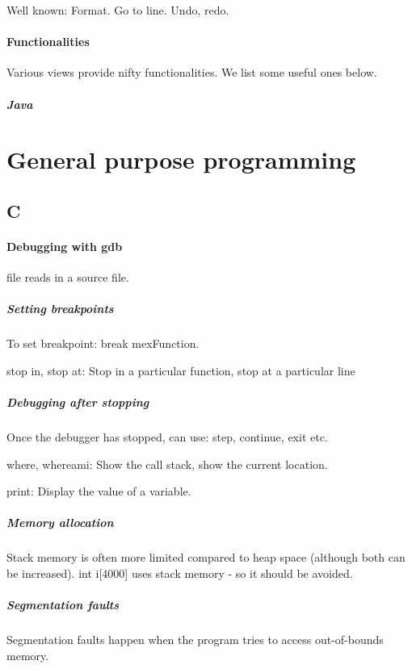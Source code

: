 \documentclass[oneside, article]{memoir}
\begin{document}
Well known: Format. Go to line. Undo, redo.

\subsection{Functionalities}
Various views provide nifty functionalities. We list some useful ones below.

\subsubsection{Java}
\tbc

\part{General purpose programming}
\chapter{C}
\subsection{Debugging with gdb}
file reads in a source file.

\subsubsection{Setting breakpoints}
To set breakpoint: break mexFunction.

stop in, stop at: Stop in a particular function, stop at a particular line

\subsubsection{Debugging after stopping}
Once the debugger has stopped, can use: step, continue, exit etc.

where, whereami: Show the call stack, show the current location.

print: Display the value of a variable.

\subsubsection{Memory allocation}
Stack memory is often more limited compared to heap space (although both can be increased). int i[4000] uses stack memory - so it should be avoided.

\subsubsection{Segmentation faults}
Segmentation faults happen when the program tries to access out-of-bounds memory.
\end{document}
